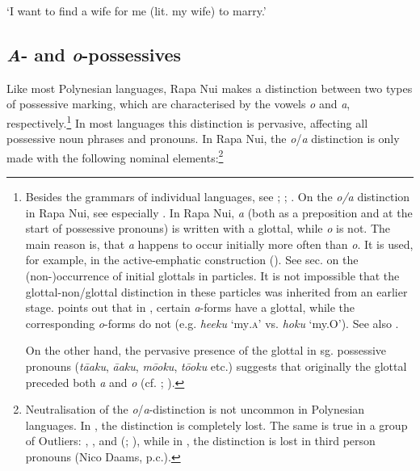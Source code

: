\glt 
‘I want to find a wife for me (lit. my wife) to marry.’ \textstyleExampleref{[R491.005]} 
\z

\subsection{\textit{A}{}- and \textit{o}{}-possessives}\label{sec:6.3.2}
Like most Polynesian languages, Rapa Nui makes a distinction between two types of possessive marking, which are characterised by the vowels \textit{o} and \textit{a}, respectively.\footnote{\label{fn:292}Besides the grammars of individual languages, see \citet[42-44]{Clark1976}; \citet{Capell1931}; \citet{Biggs2000}. On the \textit{o/a} distinction in Rapa Nui, see especially \citet{MulloyRapu1977}.
In Rapa Nui, \textit{{\ꞌ}a} (both as a preposition and at the start of possessive pronouns) is written with a glottal, while \textit{o} is not. The main reason is, that \textit{{\ꞌ}a} happens to occur initially more often than \textit{o}. It is used, for example, in the active-emphatic construction (). See sec.  on the (non\nobreakdash-)occurrence of initial glottals in particles. It is not impossible that the glottal-non/glottal distinction in these particles was inherited from an earlier stage. \citet[259]{Clark2000Possessive} points out that in , certain \textit{a}{}-forms have a glottal, while the corresponding \textit{o}{}-forms do not (e.g. \textit{\mbox{he{\ꞌ}eku}} ‘my\textsc{.a}’ vs. \textit{hoku} ‘my.O’). See also \citet[48]{Wilson1982}.

On the other hand, the pervasive presence of the glottal in sg. possessive pronouns (\mbox{\textit{tā{\ꞌ}aku}}, \mbox{\textit{{\ꞌ}ā{\ꞌ}aku}}, \mbox{\textit{mō{\ꞌ}oku}}, \textit{tō{\ꞌ}oku} etc.) suggests that originally the glottal preceded both \textit{a} and \textit{o} (cf. \citealt[232]{Lynch1997}; \citealt[50]{Wilson1982}).} In most languages this distinction is pervasive, affecting all possessive noun phrases and pronouns. In Rapa Nui, the \textit{o}/\textit{a} distinction is only made with the following nominal elements:\footnote{\label{fn:293}Neutralisation of the \textit{o}/\textit{a}{}-distinction is not uncommon in Polynesian languages. In  \citep[34]{Seiter1980}, the distinction is completely lost. The same is true in a group of Outliers: , ,  and  (\citealt[11]{Wilson1982}; \citealt[267]{Clark2000Possessive}), while in , the distinction is lost in third person pronouns (Nico Daams, p.c.).}

